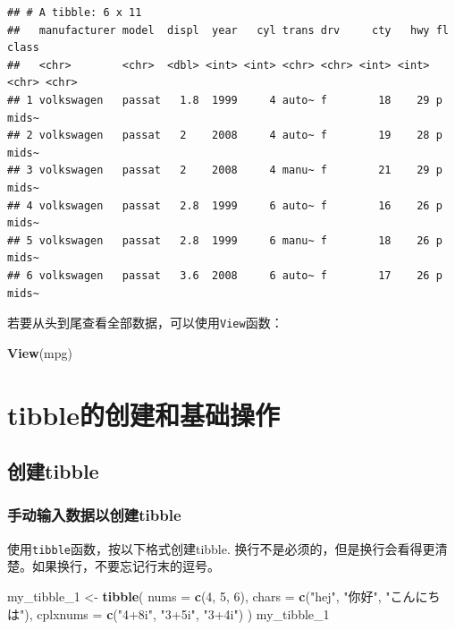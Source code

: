 \documentclass[]{book}
\newenvironment{Shaded}{\begin{snugshade}}{\end{snugshade}}
\newcommand{\DataTypeTok}[1]{\textcolor[rgb]{0.13,0.29,0.53}{#1}}
\newcommand{\DecValTok}[1]{\textcolor[rgb]{0.00,0.00,0.81}{#1}}
\newcommand{\KeywordTok}[1]{\textcolor[rgb]{0.13,0.29,0.53}{\textbf{#1}}}
\newcommand{\NormalTok}[1]{#1}
\newcommand{\StringTok}[1]{\textcolor[rgb]{0.31,0.60,0.02}{#1}}
\begin{document}
\begin{verbatim}
## # A tibble: 6 x 11
##   manufacturer model  displ  year   cyl trans drv     cty   hwy fl    class
##   <chr>        <chr>  <dbl> <int> <int> <chr> <chr> <int> <int> <chr> <chr>
## 1 volkswagen   passat   1.8  1999     4 auto~ f        18    29 p     mids~
## 2 volkswagen   passat   2    2008     4 auto~ f        19    28 p     mids~
## 3 volkswagen   passat   2    2008     4 manu~ f        21    29 p     mids~
## 4 volkswagen   passat   2.8  1999     6 auto~ f        16    26 p     mids~
## 5 volkswagen   passat   2.8  1999     6 manu~ f        18    26 p     mids~
## 6 volkswagen   passat   3.6  2008     6 auto~ f        17    26 p     mids~
\end{verbatim}

若要从头到尾查看全部数据，可以使用\texttt{View}函数：

\begin{Shaded}
\begin{Highlighting}[]
\KeywordTok{View}\NormalTok{(mpg)}
\end{Highlighting}
\end{Shaded}

\hypertarget{tibble-basics}{%
\section{tibble的创建和基础操作}\label{tibble-basics}}

\hypertarget{tibble-create}{%
\subsection{创建tibble}\label{tibble-create}}

\hypertarget{tibble-create-manual}{%
\subsubsection{手动输入数据以创建tibble}\label{tibble-create-manual}}

使用\texttt{tibble}函数，按以下格式创建tibble. 换行不是必须的，但是换行会看得更清楚。如果换行，不要忘记行末的逗号。

\begin{Shaded}
\begin{Highlighting}[]
\NormalTok{my_tibble_}\DecValTok{1}\NormalTok{ <-}\StringTok{ }\KeywordTok{tibble}\NormalTok{(}
                \DataTypeTok{nums =} \KeywordTok{c}\NormalTok{(}\DecValTok{4}\NormalTok{, }\DecValTok{5}\NormalTok{, }\DecValTok{6}\NormalTok{),}
                \DataTypeTok{chars =} \KeywordTok{c}\NormalTok{(}\StringTok{"hej"}\NormalTok{, }\StringTok{"你好"}\NormalTok{, }\StringTok{"こんにちは"}\NormalTok{),}
                \DataTypeTok{cplxnums =} \KeywordTok{c}\NormalTok{(}\StringTok{"4+8i"}\NormalTok{, }\StringTok{"3+5i"}\NormalTok{, }\StringTok{"3+4i"}\NormalTok{)}
\NormalTok{                )}
\NormalTok{my_tibble_}\DecValTok{1}
\end{Highlighting}
\end{Shaded}
\end{document}
